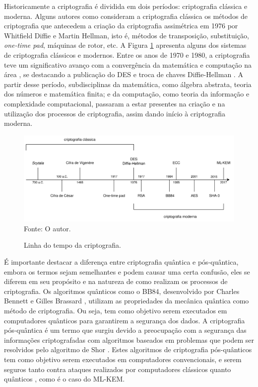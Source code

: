 Historicamente a criptografia é dividida em dois períodos: criptografia clássica e moderna. Alguns autores como \cite{criptografia_e_seguranca_de_redes,introduction_to_modern_cryptography} consideram a criptografia clássica os métodos de criptografia que antecedem a criação da criptografia assimétrica em 1976 por Whitfield Diffie e Martin Hellman, isto é, métodos de transposição, substituição, \textit{one-time pad}, máquinas de rotor, etc. A Figura \ref{fig:timeline} apresenta alguns dos sistemas de criptografia clássicos e modernos. Entre os anos de 1970 e 1980, a criptografia teve um significativo avanço com a convergência da matemática e computação na área \cite{introduction_to_modern_cryptography}, se destacando a publicação do DES \cite{des} e troca de chaves Diffie-Hellman \cite{diffie-hellman}. A partir desse período, subdisciplinas da matemática, como álgebra abstrata, teoria dos números e matemática finita; e da computação, como teoria da informação e complexidade computacional, passaram a estar presentes na criação e na utilização dos processos de criptografia, assim dando início à criptografia moderna.

    \begin{figure}[htb!]
        \centering
        \caption{Linha do tempo da criptografia.}
        \includegraphics[width=1\textwidth]{Figuras/timeline.png}\\
        \footnotesize{Fonte: O autor.}
        \label{fig:timeline}
    \end{figure}

É importante destacar a diferença entre criptografia quântica e pós-quântica, embora os termos sejam semelhantes e podem causar uma certa confusão, eles se diferem em seu propósito e na natureza de como realizam os processos de criptografia. Os algoritmos quânticos como o BB84, desenvolvido por Charles Bennett e Gilles Brassard \cite{bb84}, utilizam as propriedades da mecânica quântica como método de criptografia. Ou seja, tem como objetivo serem executados em computadores quânticos para garantirem a segurança dos dados. A criptografia pós-quântica é um termo que surgiu devido a preocupação com a segurança das informações criptografadas com algoritmos baseados em problemas que podem ser resolvidos pelo algoritmo de Shor \cite{shor}. Estes algoritmos de criptografia pós-quânticos tem como objetivo serem executados em computadores convencionais, e serem seguros tanto contra ataques realizados por computadores clássicos quanto quânticos \cite{nist}, como é o caso do \ac{ML-KEM}.

